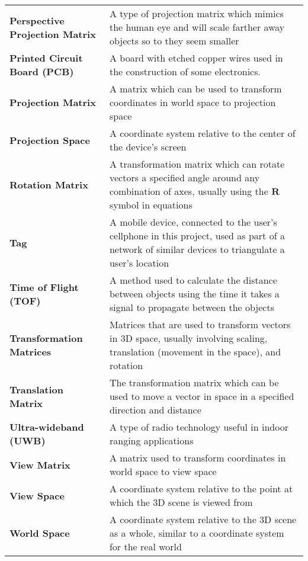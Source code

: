 \documentclass[
11pt, %
oneside, %
english, %
onehalfspacing, %
nolistspacing, %
hidelinks, %
headsepline, %
consistentlayout, %
table, %
]{MastersDoctoralThesis} %
\begin{document}
\begin{longtable}{p{6cm} p{7cm}}
\textbf{Perspective Projection Matrix} & A type of projection matrix which mimics the human eye and will scale farther away objects so to they seem smaller\\
\textbf{Printed Circuit Board (PCB)} & A board with etched copper wires used in the construction of some electronics. \\
\textbf{Projection Matrix} & A matrix which can be used to transform coordinates in world space to projection space\\
\textbf{Projection Space} & A coordinate system relative to the center of the device's screen\\
\textbf{Rotation Matrix} & A transformation matrix which can rotate vectors a specified angle around any combination of axes, usually using the $\mathbf{R}$ symbol in equations\\
\textbf{Tag} & A mobile device, connected to the user's cellphone in this project, used as part of a network of similar devices to triangulate a user's location\\
\textbf{Time of Flight (TOF)} & A method used to calculate the distance between objects using the time it takes a signal to propagate between the objects\\
\textbf{Transformation Matrices} & Matrices that are used to transform vectors in 3D space, usually involving scaling, translation (movement in the space), and rotation\\
\textbf{Translation Matrix} & The transformation matrix which can be used to move a vector in space in a specified direction and distance\\
\textbf{Ultra-wideband (UWB)} & A type of radio technology useful in indoor ranging applications\\
\textbf{View Matrix} & A matrix used to transform coordinates in world space to view space\\
\textbf{View Space} & A coordinate system relative to the point at which the 3D scene is viewed from\\
\textbf{World Space} & A coordinate system relative to the 3D scene as a whole, similar to a coordinate system for the real world\\
\end{longtable}


\end{document}
